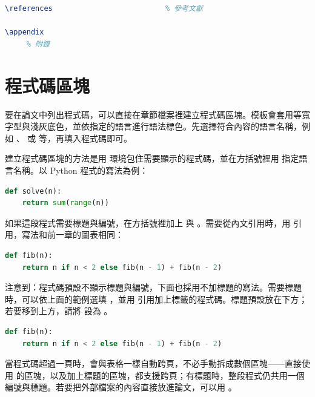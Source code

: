 \begin{lstlisting}[language=latex]


\references                          % 參考文獻

\appendix
     % 附錄
\end{lstlisting}

\section{程式碼區塊}

要在論文中列出程式碼，可以直接在章節檔案裡建立程式碼區塊。模板會套用等寬字型與淺灰底色，並依指定的語言進行語法標色。先選擇符合內容的語言名稱，例如 、 或  等，再填入程式碼即可。

建立程式碼區塊的方法是用  環境包住需要顯示的程式碼，並在方括號裡用  指定語言名稱。以 Python 程式的寫法為例：

\begin{codeblock}[language=latex]
\begin{lstlisting}[language=python]
def solve(n):
    return sum(range(n))
\end{lstlisting}
\end{codeblock}

如果這段程式需要標題與編號，在方括號裡加上  與 。需要從內文引用時，用 \code{\lstref} 引用，寫法和前一章的圖表相同：

\begin{codeblock}[language=latex]
\begin{lstlisting}[language=python,caption={遞迴版本},label=lst:fib]
def fib(n):
    return n if n < 2 else fib(n - 1) + fib(n - 2)
\end{lstlisting}
\end{codeblock}

注意到：程式碼預設不顯示標題與編號，下面也採用不加標題的寫法。需要標題時，可以依上面的範例選填 ，並用  引用加上標籤的程式碼。標題預設放在下方；若要移到上方，請將  設為 。

\begin{lstlisting}[language=python]
def fib(n):
    return n if n < 2 else fib(n - 1) + fib(n - 2)
\end{lstlisting}

當程式碼超過一頁時，會與表格一樣自動跨頁，不必手動拆成數個區塊——直接使用  的區塊，以及加上標題的區塊，都支援跨頁；有標題時，整段程式仍共用一個編號與標題。若要把外部檔案的內容直接放進論文，可以用 \code{}。


